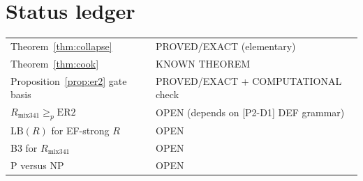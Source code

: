 \documentclass[11pt]{article}
\theoremstyle{remark}\newtheorem{remark}[theorem]{Remark}
\begin{document}
\section{Status ledger}
\begin{tabular}{ll}
Theorem~\ref{thm:collapse} & PROVED/EXACT (elementary)\\
Theorem~\ref{thm:cook} & KNOWN THEOREM\\
Proposition~\ref{prop:er2} gate basis & PROVED/EXACT + COMPUTATIONAL check\\
$R_{\mathrm{mix341}}\ge_p\mathrm{ER2}$ & OPEN (depends on [P2-D1] DEF grammar)\\
$\mathrm{LB}(R)$ for EF-strong $R$ & OPEN\\
B3 for $R_{\mathrm{mix341}}$ & OPEN\\
P versus NP & OPEN
\end{tabular}
\end{document}
